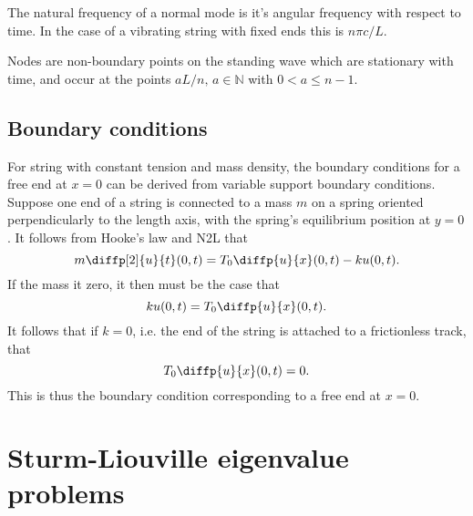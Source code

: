 \documentclass{article}
\begin{document}
\begin{definition}
	The natural frequency of a normal mode is it's angular frequency with respect to time. In the case of a vibrating string with fixed ends this is \(n\pi c/L\).
\end{definition}
\begin{definition}[Node]
	Nodes are non-boundary points on the standing wave which are stationary with time, and occur at the points \(aL/n,\,a\in\mathbb{N}\) with \(0<a\leq n-1\).
\end{definition}
\subsection{Boundary conditions}
For string with constant tension and mass density, the boundary conditions for a free end at \(x=0\) can be derived from variable support boundary conditions. Suppose one end of a string is connected to a mass \(m\) on a spring oriented perpendicularly to the length axis, with the spring's equilibrium position at \(y=0\). It follows from Hooke's law and N2L that
\begin{equation*}
	m\diffp[2]{u}{t}(0,t)=T_0\diffp{u}{x}(0,t)-ku(0,t).
\end{equation*}
If the mass it zero, it then must be the case that
\begin{equation*}
	ku(0,t)=T_0\diffp{u}{x}(0,t).
\end{equation*}
It follows that if \(k=0\), i.e. the end of the string is attached to a frictionless track, that
\begin{equation*}
	T_0\diffp{u}{x}(0,t)=0.
\end{equation*}
This is thus the boundary condition corresponding to a free end at \(x=0\).
\clearpage
\section{Sturm-Liouville eigenvalue problems}
\end{document}
